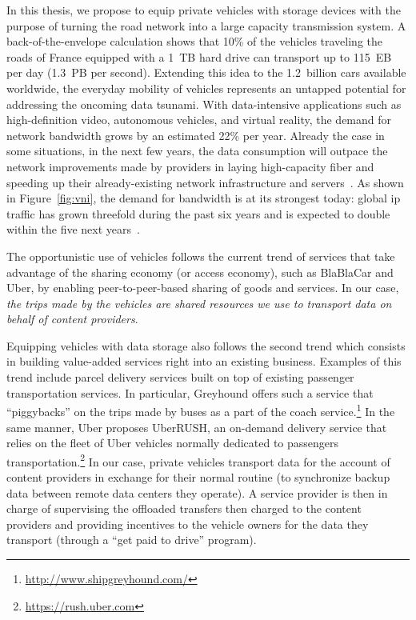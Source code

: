 In this thesis, we propose to equip private vehicles with storage devices with the purpose of turning the road network into a large capacity transmission system. A back-of-the-envelope calculation shows that 10\% of the vehicles traveling the roads of France equipped with a 1~TB hard drive can transport up to 115~EB per day (1.3~PB per second). Extending this idea to the 1.2~billion cars available worldwide, the everyday mobility of vehicles represents an untapped potential for addressing the oncoming data tsunami. With data-intensive applications such as high-definition video, autonomous vehicles, and virtual reality, the demand for network bandwidth grows by an estimated 22\% per year. Already the case in some situations, in the next few years, the data consumption will outpace the network improvements made by providers in laying high-capacity fiber and speeding up their already-existing network infrastructure and servers~\cite{hecht2016bandwidth}. As shown in Figure~\ref{fig:vni}, the demand for bandwidth is at its strongest today: global \acrshort{ip} traffic has grown threefold during the past six years and is expected to double within the five next years~\cite{index2014forecast,gantz2012digital}.

The opportunistic use of vehicles follows the current trend of services that take advantage of the sharing economy (or access economy), such as BlaBlaCar and Uber, by enabling peer-to-peer-based sharing of goods and services. In our case, \textit{the trips made by the vehicles are shared resources we use to transport data on behalf of content providers}. 

Equipping vehicles with data storage also follows the second trend which consists in building value-added services right into an existing business. Examples of this trend include parcel delivery services built on top of existing passenger transportation services. In particular, Greyhound offers such a service that ``piggybacks'' on the trips made by buses as a part of the coach service.\footnote{\url{http://www.shipgreyhound.com/}} In the same manner, Uber proposes UberRUSH, an on-demand delivery service that relies on the fleet of Uber vehicles normally dedicated to passengers transportation.\footnote{\url{https://rush.uber.com}} In our case, private vehicles transport data for the account of content providers in exchange for their normal routine (\eg to synchronize backup data between remote data centers they operate). A service provider is then in charge of supervising the offloaded transfers then charged to the content providers and providing incentives to the vehicle owners for the data they transport (\eg through a ``get paid to drive'' program).

